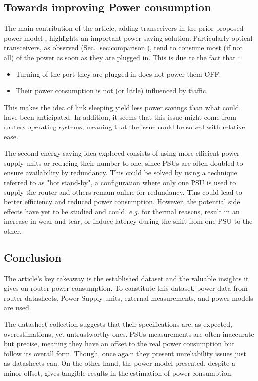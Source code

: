 \subsection{Towards improving Power consumption}\label{sec:improving} 
The main contribution of the article, adding transceivers in the prior proposed power model  \cite{35}, highlights an important power saving solution.
Particularly optical transceivers, as observed (Sec. \ref{sec:comparison}), tend to consume most (if not all) of the power as soon as they are plugged in.  
This is due to the fact that : 
\begin{itemize}
	\item [1)] Turning of the port they are plugged in does not power them OFF.  
	\item [2)] Their power consumption is not (or little) influenced by traffic.
\end{itemize}
This makes the idea of link sleeping yield less power savings than what could have been anticipated.
In addition, it seems that this issue might come from routers operating systems, meaning that the issue could be solved with relative ease.

The second energy-saving idea explored consists of using more efficient power supply units or reducing their number to one, since PSUs are often doubled to ensure availability by redundancy.  
This could be solved by using a technique referred to as "hot stand-by", a configuration where only one PSU is used to supply the router and others remain online for redundancy.   
This could lead to better efficiency and reduced power consumption.
However, the potential side effects have yet to be studied and could, \textit{e.g.} for thermal reasons, result in an increase in wear and tear, or induce latency during the shift from one PSU to the other.  

\subsection{Conclusion}
The article's key takeaway is the established dataset and the valuable insights it gives on router power consumption.
To constitute this dataset, power data from  router datasheets, Power Supply units, external measurements, and power models are used.  

The datasheet collection suggests that their specifications are, as expected, overestimations, yet untrustworthy ones.   
PSUs measurements are often inaccurate but precise, meaning they have an offset to the real power consumption but follow its overall form. 
Though, once again they present unreliability issues just as datasheets can.
On the other hand, the power model presented, despite a minor offset, gives tangible results in the estimation of power consumption.

